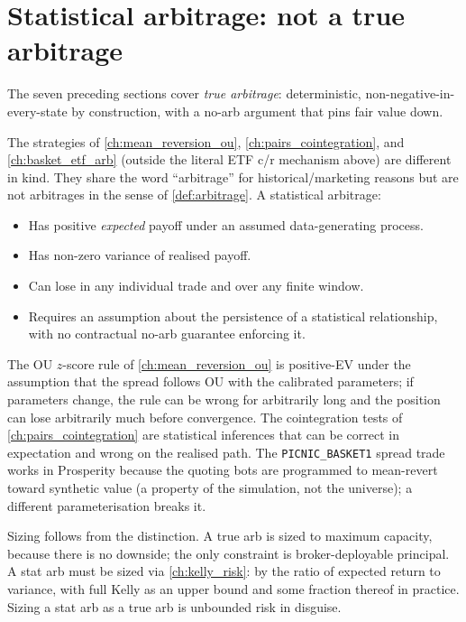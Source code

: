 \section{Statistical arbitrage: not a true arbitrage}
\label{sec:ch13_stat_arb}

The seven preceding sections cover \emph{true arbitrage}:
deterministic, non-negative-in-every-state by construction, with
a no-arb argument that pins fair value down.

The strategies of \cref{ch:mean_reversion_ou},
\cref{ch:pairs_cointegration}, and \cref{ch:basket_etf_arb}
(outside the literal ETF c/r mechanism above) are different in
kind. They share the word ``arbitrage'' for historical/marketing
reasons but are not arbitrages in the sense of
\cref{def:arbitrage}. A statistical arbitrage:
\begin{itemize}
  \item Has positive \emph{expected} payoff under an assumed
  data-generating process.
  \item Has non-zero variance of realised payoff.
  \item Can lose in any individual trade and over any finite
  window.
  \item Requires an assumption about the persistence of a
  statistical relationship, with no contractual no-arb
  guarantee enforcing it.
\end{itemize}

The OU $z$-score rule of \cref{ch:mean_reversion_ou} is
positive-EV under the assumption that the spread follows OU
with the calibrated parameters; if parameters change, the rule
can be wrong for arbitrarily long and the position can lose
arbitrarily much before convergence. The cointegration tests of
\cref{ch:pairs_cointegration} are statistical inferences that
can be correct in expectation and wrong on the realised path.
The \texttt{PICNIC\_BASKET1} spread trade works in Prosperity
because the quoting bots are programmed to mean-revert toward
synthetic value (a property of the simulation, not the
universe); a different parameterisation breaks it.

Sizing follows from the distinction. A true arb is sized to
maximum capacity, because there is no downside; the only
constraint is broker-deployable principal. A stat arb must be
sized via \cref{ch:kelly_risk}: by the ratio of expected return
to variance, with full Kelly as an upper bound and some
fraction thereof in practice. Sizing a stat arb as a true arb
is unbounded risk in disguise.


